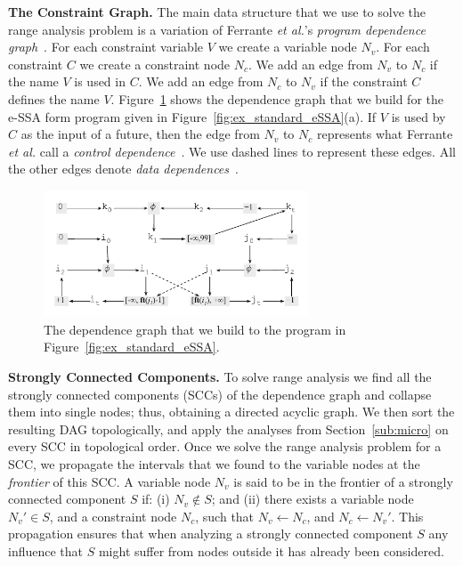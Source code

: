 \documentclass[times]{speauth}
\begin{document}
\noindent
\textbf{The Constraint Graph.}
The main data structure that we use to solve the range analysis problem is
a variation of Ferrante {\em et al.}'s {\em program dependence
graph}~\cite{Ferrante87}.
For each constraint variable $V$ we create a variable node $N_v$.
For each constraint $C$ we create a constraint node $N_c$.
We add an edge from $N_v$ to $N_c$ if the name $V$ is used in $C$.
We add an edge from $N_c$ to $N_v$ if the constraint $C$ defines the name
$V$.
Figure~\ref{fig:ex_graph} shows the dependence graph that we build for the
e-SSA form program given in Figure~\ref{fig:ex_standard_eSSA}(a).
If $V$ is used by $C$ as the input of a future, then the edge from
$N_v$ to $N_c$ represents what Ferrante {\em et al.} call a {\em control
dependence}~\cite[p.323]{Ferrante87}.
We use dashed lines to represent these edges.
All the other edges denote {\em data dependences}~\cite[p.322]{Ferrante87}.

\begin{figure}[t!]
\begin{center}
\includegraphics[width=0.7\textwidth]{images/ex_graph}
\end{center}
\caption{\label{fig:ex_graph}
The dependence graph that we build to the program in
Figure~\ref{fig:ex_standard_eSSA}.}
\end{figure}

\noindent
\textbf{Strongly Connected Components.}
To solve range analysis we find all the strongly connected components (SCCs) of
the dependence graph and collapse them into single nodes; thus, obtaining a
directed acyclic graph.
We then sort the resulting DAG topologically, and apply the analyses from
Section~\ref{sub:micro} on every SCC in topological order.
Once we solve the range analysis problem for a SCC, we propagate the
intervals that we found to the variable nodes at the {\em frontier} of this
SCC.
A variable node $N_v$ is said to be in the frontier of a strongly connected
component $S$ if:
(i) $N_v \notin S$; and
(ii) there exists a variable node $N_v' \in S$, and a constraint node $N_c$,
such that $N_v \leftarrow N_c$, and $N_c \leftarrow N_v'$.
This propagation ensures that when analyzing a strongly connected component $S$
any influence that $S$ might suffer from nodes outside it has already been
considered.
\end{document}
